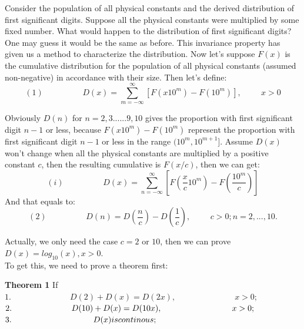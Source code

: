 \documentclass[12pt]{article}
\begin{document}
\par 
Consider the population of all physical constants and the derived distribution of first significant digits. Suppose all the physical constants were multiplied by some fixed number. What would happen to the distribution of first significant digits? One may guess it would be the same as before. This invariance property has given us a method to characterize the distribution.
Now let's suppose $F(x)$ is the cumulative distribution for the population of all physical constants (assumed non-negative) in accordance with their size. Then let's define:
\begin{equation*}
(1)\hspace{2cm}D(x)=\sum\limits_{m=-\infty}^\infty [F(x10^m)-F(10^m)],\hspace{1cm}x>0
\end{equation*}
\par Obviously $D(n)$ for $n=2,3......9,10$ gives the proportion with first significant digit $n-1$ or less, because $F(x10^m)-F(10^m)$ represent the proportion with first significant digit $n-1$ or less in the range $(10^{m},10^{m+1}]$.
Assume $D(x)$ won't change when all the physical constants are multiplied by a positive constant $c$, then the resulting cumulative is $F(x/c)$, then we can get:
\begin{equation*}
(i)\hspace{2cm}D(x)=\sum\limits_{n=-\infty}^\infty [F(\dfrac{x}{c}10^m)-F(\dfrac{10^m}{c})]
\end{equation*}
And that equals to:
\begin{equation*}
(2)\hspace{2cm}D(n)=D(\dfrac{n}{c})-D(\dfrac{1}{c}),\hspace{1cm}c>0;n=2,...,10.
\end{equation*}
\par Actually, we only need the case $c=2$ or $10$, then we can prove $D(x)=log_{10}(x), x>0$.\\
To get this, we need to prove a theorem first:\\
\par {\textbf{Theorem 1}} If\\
$1. \hspace{3cm} D(2)+D(x)=D(2x),\hspace{3cm} x>0;$\\
$2. \hspace{2.56cm} D(10)+D(x)=D(10x),\hspace{3cm} x>0;$\\
$3. \hspace{3.5cm} D(x) is continous;$\\
\end{document}
